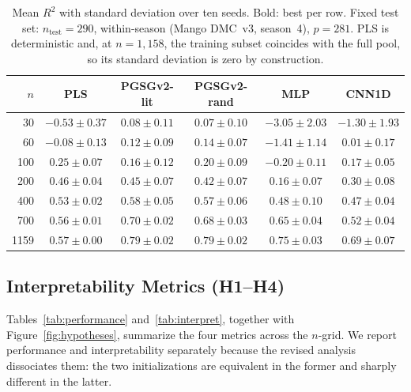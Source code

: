 \documentclass[preprint,12pt,hidelinks]{elsarticle}
\begin{document}
\begin{table}[htb]
  \centering
  \caption{Mean $R^2$ with standard deviation over ten seeds. Bold: best
           per row. Fixed test set: $n_\mathrm{test} = 290$, within-season
           (Mango DMC~v3, season~4), $p = 281$. PLS is deterministic and, at
           $n = 1{,}158$, the training subset coincides with the full pool,
           so its standard deviation is zero by construction.}
  \label{tab:scale}
  \renewcommand{\arraystretch}{1.15}
  \setlength{\tabcolsep}{4pt}
  \small
  \begin{tabular}{r ccccc}
    \toprule
    $n$ & PLS & PGSGv2-lit & PGSGv2-rand & MLP & CNN1D \\
    \midrule
      30  & $-0.53 \pm 0.37$ & $\mathbf{0.08 \pm 0.11}$ & $0.07 \pm 0.10$
          & $-3.05 \pm 2.03$ & $-1.30 \pm 1.93$ \\
      60  & $-0.08 \pm 0.13$ & $0.12 \pm 0.09$ & $\mathbf{0.14 \pm 0.07}$
          & $-1.41 \pm 1.14$ & $0.01 \pm 0.17$ \\
     100  & $\mathbf{0.25 \pm 0.07}$ & $0.16 \pm 0.12$ & $0.20 \pm 0.09$
          & $-0.20 \pm 0.11$ & $0.17 \pm 0.05$ \\
     200  & $\mathbf{0.46 \pm 0.04}$ & $0.45 \pm 0.07$ & $0.42 \pm 0.07$
          & $0.16 \pm 0.07$ & $0.30 \pm 0.08$ \\
     400  & $0.53 \pm 0.02$ & $\mathbf{0.58 \pm 0.05}$ & $0.57 \pm 0.06$
          & $0.48 \pm 0.10$ & $0.47 \pm 0.04$ \\
     700  & $0.56 \pm 0.01$ & $\mathbf{0.70 \pm 0.02}$ & $0.68 \pm 0.03$
          & $0.65 \pm 0.04$ & $0.52 \pm 0.04$ \\
    1159  & $0.57 \pm 0.00$ & $0.79 \pm 0.02$ & $\mathbf{0.79 \pm 0.02}$
          & $0.75 \pm 0.03$ & $0.69 \pm 0.07$ \\
    \bottomrule
  \end{tabular}
\end{table}

\subsection{Interpretability Metrics (H1--H4)}

Tables~\ref{tab:performance} and~\ref{tab:interpret}, together with
Figure~\ref{fig:hypotheses}, summarize the four metrics across the $n$-grid.
We report performance and interpretability separately because the revised
analysis dissociates them: the two initializations are equivalent in the
former and sharply different in the latter.
\end{document}

